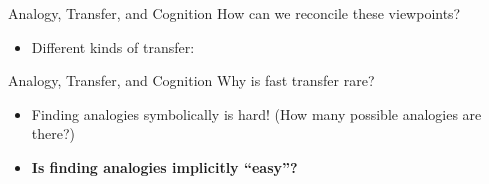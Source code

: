 \documentclass{beamer}
\begin{document}
\begin{frame}{Analogy, Transfer, and Cognition}
How can we reconcile these viewpoints?
\begin{itemize}
    \item<2-> Different kinds of transfer:
\end{itemize}
\end{frame}

\begin{frame}{Analogy, Transfer, and Cognition}
Why is fast transfer rare?
\begin{itemize}
    \item<2-> Finding analogies symbolically is hard! (How many possible analogies are there?)  
\end{itemize}
\begin{itemize}
    \item<4-> \textbf{Is finding analogies implicitly ``easy''?}
\end{itemize}
\end{frame}
\end{document}

